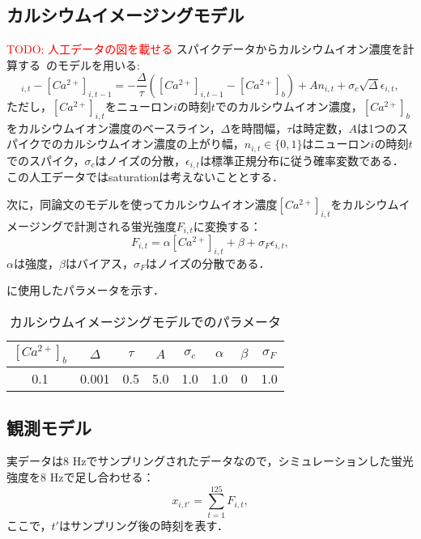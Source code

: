 \subsection{カルシウムイメージングモデル}
\textcolor{red}{TODO: 人工データの図を載せる}
スパイクデータからカルシウムイオン濃度を計算する~\cite{Vogelstein2009}のモデルを用いる:
\begin{equation}
  [Ca^{2+}]_{i,t} - [Ca^{2+}]_{i,t-1} = - \frac{\Delta}{\tau}([Ca^{2+}]_{i,t-1} - [Ca^{2+}]_b) + An_{i,t} + \sigma_c \sqrt{\Delta} \epsilon_{i,t},
  \label{eq:calcium}
\end{equation}
ただし，$[Ca^{2+}]_{i,t}$をニューロン$i$の時刻$t$でのカルシウムイオン濃度，$[Ca^{2+}]_b$をカルシウムイオン濃度のベースライン，$\Delta$を時間幅，$\tau$は時定数，$A$は1つのスパイクでのカルシウムイオン濃度の上がり幅，$n_{i,t} \in \{0,1\}$はニューロン$i$の時刻$t$でのスパイク，$\sigma_c$はノイズの分散，$\epsilon_{i,t}$は標準正規分布に従う確率変数である．
この人工データではsaturationは考えないこととする．

次に，同論文のモデルを使ってカルシウムイオン濃度$[Ca^{2+}]_{i,t}$をカルシウムイメージングで計測される蛍光強度$F_{i,t}$に変換する：
\begin{equation}
	F_{i,t} = \alpha[Ca^{2+}]_{i,t} + \beta + \sigma_F \epsilon_{i,t},
  \label{eq:intensity}
\end{equation}
$\alpha$は強度，$\beta$はバイアス，$\sigma_F$はノイズの分散である．

に使用したパラメータを示す．

\begin{table}[htb]
  \center
  \begin{tabular}{|cccccccc|} \hline
    $[Ca^{2+}]_b$ & $\Delta$ & $\tau$ & $A$ & $\sigma_c$ & $\alpha$ & $\beta$ & $\sigma_F$ \\ \hline
    0.1 & 0.001 & 0.5 & 5.0 & 1.0 & 1.0 & 0 & 1.0 \\ \hline
  \end{tabular}
  \caption{カルシウムイメージングモデルでのパラメータ}
  \label{tab:parameter2}
\end{table}

\subsection{観測モデル}
実データは8 Hzでサンプリングされたデータなので，シミュレーションした蛍光強度を8 Hzで足し合わせる：
\begin{equation}
  x_{i,t'} = \sum_{t=1}^{125} F_{i,t},
  \label{eq:observation}
\end{equation}
ここで，$t'$はサンプリング後の時刻を表す．

